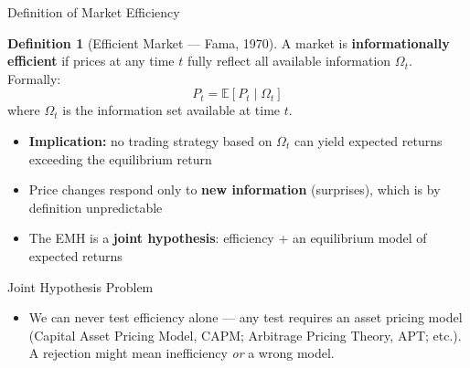 \documentclass[9pt, aspectratio=169, t]{beamer}
\theoremstyle{definition}
\newtheorem{defn}{Definition}
\newenvironment{cminipage}[1]{%
    \par\noindent\hfill\begin{minipage}{#1}\ignorespaces
}{%
    \end{minipage}\hfill\null\par
}
\newcommand{\E}{\mathbb{E}}
\begin{document}
\begin{frame}{Definition of Market Efficiency}
\begin{cminipage}{0.95\textwidth}
\begin{defn}[Efficient Market --- Fama, 1970]
A market is \textbf{informationally efficient} if prices at any time $t$ fully reflect all available information $\Omega_t$. Formally:
$$P_t = \E[P_t \mid \Omega_t]$$
where $\Omega_t$ is the information set available at time $t$.
\end{defn}

\vspace{0.05cm}
\begin{itemize}\setlength{\itemsep}{0pt}
    \item \textbf{Implication:} no trading strategy based on $\Omega_t$ can yield expected returns exceeding the equilibrium return
    \item Price changes respond only to \textbf{new information} (surprises), which is by definition unpredictable
    \item The EMH is a \textbf{joint hypothesis}: efficiency + an equilibrium model of expected returns
\end{itemize}
\vspace{-0.15cm}
\begin{alertblock}{Joint Hypothesis Problem}
\begin{itemize}\setlength{\itemsep}{0pt}
    \item We can never test efficiency alone --- any test requires an asset pricing model (Capital Asset Pricing Model, CAPM; Arbitrage Pricing Theory, APT; etc.). A rejection might mean inefficiency \textit{or} a wrong model.
\end{itemize}
\end{alertblock}
\end{cminipage}
\end{frame}
\end{document}
